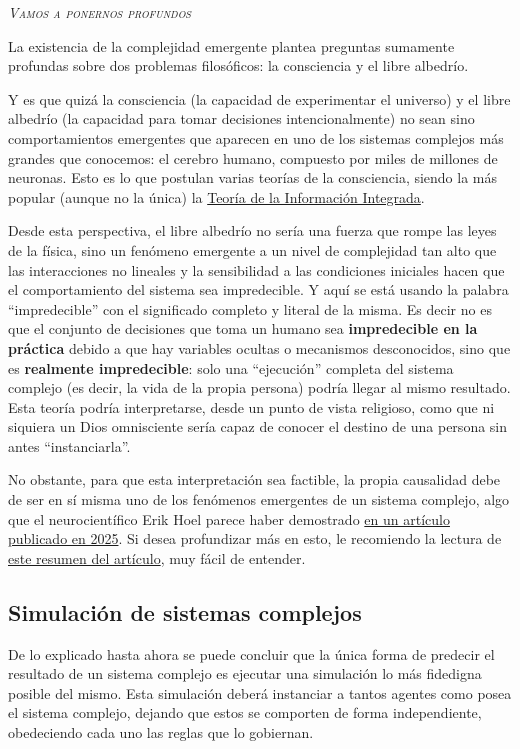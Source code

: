 \documentclass[10pt,a4paper,spanish]{article}
\newcommand{\sombreado}[2]{
  \begin{shaded}
    \begin{center} \emph{\textsc{#1}} \end{center}
    \noindent #2\\
  \end{shaded}
}
\begin{document}
\sombreado{Vamos a ponernos profundos}{La existencia de la complejidad emergente plantea preguntas sumamente profundas sobre dos problemas filosóficos: la consciencia y el libre albedrío.

Y es que quizá la consciencia (la capacidad de experimentar el universo) y el libre albedrío (la capacidad para tomar decisiones intencionalmente) no sean sino comportamientos emergentes que aparecen en uno de los sistemas complejos más grandes que conocemos: el cerebro humano, compuesto por miles de millones de neuronas. Esto es lo que postulan varias teorías de la consciencia, siendo la más popular (aunque no la única) la \href{https://iep.utm.edu/integrated-information-theory-of-consciousness/}{Teoría de la Información Integrada}. 

Desde esta perspectiva, el libre albedrío no sería una fuerza que rompe las leyes de la física, sino un fenómeno emergente a un nivel de complejidad tan alto que las interacciones no lineales y la sensibilidad a las condiciones iniciales hacen que el comportamiento del sistema sea impredecible. Y aquí se está usando la palabra ``impredecible'' con el significado completo y literal de la misma. Es decir no es que el conjunto de decisiones que toma un humano sea \textbf{impredecible en la práctica} debido a que hay variables ocultas o mecanismos desconocidos, sino que es \textbf{realmente impredecible}: solo una ``ejecución'' completa del sistema complejo (es decir, la vida de la propia persona) podría llegar al mismo resultado. Esta teoría podría interpretarse, desde un punto de vista religioso, como que ni siquiera un Dios omnisciente sería capaz de conocer el destino de una persona sin antes ``instanciarla''.

No obstante, para que esta interpretación sea factible, la propia causalidad debe de ser en sí misma uno de los fenómenos emergentes de un sistema complejo, algo que el neurocientífico Erik Hoel parece haber demostrado \href{https://arxiv.org/abs/2503.13395}{en un artículo publicado en 2025}. Si desea profundizar más en esto, le recomiendo la lectura de \href{https://www.theintrinsicperspective.com/p/i-figured-out-how-to-engineer-emergence}{este resumen del artículo}, muy fácil de entender.}

\subsection{Simulación de sistemas complejos}

De lo explicado hasta ahora se puede concluir que la única forma de predecir el resultado de un sistema complejo es ejecutar una simulación lo más fidedigna posible del mismo. Esta simulación deberá instanciar a tantos agentes como posea el sistema complejo, dejando que estos se comporten de forma independiente, obedeciendo cada uno las reglas que lo gobiernan.
\end{document}

